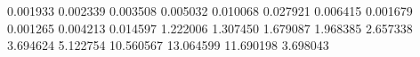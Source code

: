 0.001933
0.002339
0.003508
0.005032
0.010068
0.027921
0.006415
0.001679
0.001265
0.004213
0.014597
1.222006
1.307450
1.679087
1.968385
2.657338
3.694624
5.122754
10.560567
13.064599
11.690198
3.698043
